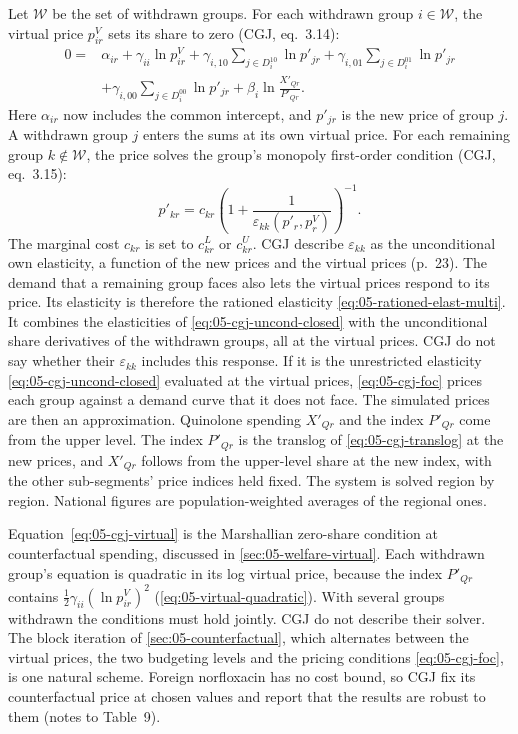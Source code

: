  Let $\mathcal{W}$ be the set of withdrawn groups. For each withdrawn group $i \in
\mathcal{W}$, the virtual price $p_{ir}^V$ sets its share to zero (CGJ, eq.~3.14):
\begin{equation}\label{eq:05-cgj-virtual}
\begin{split}
0 = {}& \alpha_{ir} + \gamma_{ii}\ln p_{ir}^V + \gamma_{i,10}\sum_{j\in D_i^{10}}\ln p'_{jr}
+ \gamma_{i,01}\sum_{j\in D_i^{01}}\ln p'_{jr} \\
&+ \gamma_{i,00}\sum_{j\in D_i^{00}}\ln p'_{jr} + \beta_i\ln\frac{X'_{Qr}}{P'_{Qr}}.
\end{split}
\end{equation}
Here $\alpha_{ir}$ now includes the common intercept, and $p'_{jr}$ is the new price of group $j$. A withdrawn group
$j$ enters the sums at its own virtual price. For each remaining group $k \notin \mathcal{W}$, the price solves the
group's monopoly first-order condition (CGJ, eq.~3.15):
\begin{equation}\label{eq:05-cgj-foc}
p'_{kr} = c_{kr}\left(1 + \frac{1}{\varepsilon_{kk}(p'_{r}, p^V_{r})}\right)^{-1}.
\end{equation}
The marginal cost $c_{kr}$ is set to $c^L_{kr}$ or $c^U_{kr}$. CGJ describe $\varepsilon_{kk}$ as the unconditional
own elasticity, a function of the new prices and the virtual prices (p.~23). The demand that a remaining group faces
also lets the virtual prices respond to its price. Its elasticity is therefore the rationed elasticity
\eqref{eq:05-rationed-elast-multi}. It combines the elasticities of \eqref{eq:05-cgj-uncond-closed} with the
unconditional share derivatives of the withdrawn groups, all at the virtual prices. CGJ do not say whether their $\varepsilon_{kk}$ includes this response. If it is the unrestricted
elasticity \eqref{eq:05-cgj-uncond-closed} evaluated at the virtual prices, \eqref{eq:05-cgj-foc} prices each group
against a demand curve that it does not face. The simulated prices are then an approximation. Quinolone spending $X'_{Qr}$ and the index $P'_{Qr}$ come from the upper level. The index
$P'_{Qr}$ is the translog of \eqref{eq:05-cgj-translog} at the new prices, and $X'_{Qr}$ follows from the upper-level
share at the new index, with the other sub-segments' price indices held fixed. The system is solved region by region.
National figures are population-weighted averages of the regional ones.

Equation~\eqref{eq:05-cgj-virtual} is the Marshallian zero-share condition at counterfactual spending, discussed in
\cref{sec:05-welfare-virtual}. Each withdrawn group's equation is quadratic in its log virtual price, because the
index $P'_{Qr}$ contains $\frac{1}{2}\gamma_{ii}(\ln p_{ir}^V)^2$ (\eqref{eq:05-virtual-quadratic}). With several
groups withdrawn the conditions must hold jointly. CGJ do not describe their solver. The block iteration of
\cref{sec:05-counterfactual}, which alternates between the virtual prices, the two budgeting levels and the pricing
conditions \eqref{eq:05-cgj-foc}, is one natural scheme. Foreign norfloxacin has no cost bound, so CGJ fix its counterfactual price at chosen values
and report that the results are robust to them (notes to Table~9).

